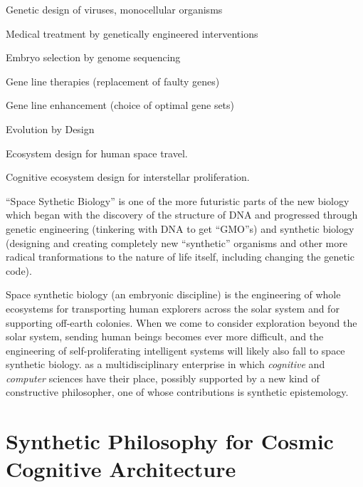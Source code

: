 \documentclass[14pt,titlepage]{extarticle}
\begin{document}
\begin{description}
\item Genetic design of viruses, monocellular organisms 
\item Medical treatment by genetically engineered interventions
\item Embryo selection by genome sequencing
\item Gene line therapies (replacement of faulty genes)
\item Gene line enhancement (choice of optimal gene sets)
\item Evolution by Design
\item Ecosystem design for human space travel.
\item Cognitive ecosystem design for interstellar proliferation.
\end{description}

``Space Sythetic Biology'' is one of the more futuristic parts of the new biology which began with the discovery of the structure of DNA and progressed through genetic engineering (tinkering with DNA to get ``GMO''s) and synthetic biology (designing and creating completely new ``synthetic'' organisms and other more radical tranformations to the nature of life itself, including changing the genetic code).

Space synthetic biology (an embryonic discipline) is the engineering of whole ecosystems for transporting human explorers across the solar system and for supporting off-earth colonies.
When we come to consider exploration beyond the solar system, sending human beings becomes ever more difficult, and the engineering of self-proliferating intelligent systems will likely also fall to space synthetic biology.
 as a multidisciplinary enterprise in which \emph{cognitive} and \emph{computer} sciences have their place, possibly supported by a new kind of constructive philosopher, one of whose contributions is synthetic epistemology.


\section{Synthetic Philosophy for Cosmic Cognitive Architecture}





%
%






\end{document}
